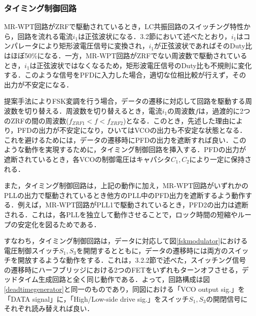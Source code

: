 \subsubsection{タイミング制御回路}
MR-WPT回路がZRFで駆動されているとき，LC共振回路のスイッチング特性から，回路を流れる電流$i_1$は正弦波状になる．3.2節において述べたとおり，$i_1$はコンパレータにより矩形波電圧信号に変換され，$i_1$が正弦波状であればそのDuty比はほぼ50\%になる．一方，MR-WPT回路がZRFでない周波数で駆動されているとき，$i_1$は正弦波状ではなくなるため，矩形波電圧信号のDuty比も不規則に変化する．このような信号をPFDに入力した場合，適切な位相比較が行えず，その出力が不安定になる．\par
提案手法によりFSK変調を行う場合，データの遷移に対応して回路を駆動する周波数を切り替える．周波数を切り替えるとき，電流$i_{1}$の周波数$f$は，過渡的に2つのZRFの間の周波数($f_{ZRF1}<f<f_{ZRF2}$)となる．このとき，先述した理由により，PFDの出力が不安定になり，ひいてはVCOの出力も不安定な状態となる．これを避けるためには，データの遷移時にPFDの出力を遮断すれば良い．このような動作を実現するために，タイミング制御回路を挿入する．PFDの出力が遮断されているとき，各VCOの制御電圧はキャパシタ$C_1,C_2$により一定に保持される．\par 
また，タイミング制御回路は，上記の動作に加え，MR-WPT回路がいずれかのPLLの出力で駆動されているとき他方のPLL中のPFD出力を遮断するよう動作する．例えば，MR-WPT回路がPLL1で駆動されているとき，PFD2の出力は遮断される．これは，各PLLを独立して動作させることで，ロック時間の短縮やループの安定化を図るためである．\par 
すなわち，タイミング制御回路は，データに対応して図\ref{fskmodulator}における電圧制御スイッチ$S_1, S_3$を開閉するとともに，データの遷移時には両方のスイッチを開放するような動作をする．これは，3.2.2節で述べた，スイッチング信号の遷移時にハーフブリッジにおける2つのFETをいずれもターンオフさせる，デッドタイム生成回路と全く同じ動作である．よって，回路構成は図\ref{deadtimegenerator}と同一のものであり，同図における「VCO output sig.」を「DATA signal」に，「High/Low-side drive sig.」をスイッチ$S_1, S_3$の開閉信号にそれぞれ読み替えれば良い．

